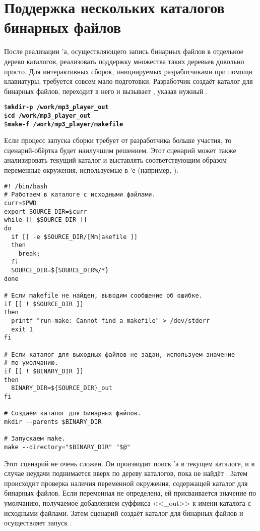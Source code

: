 \section{Поддержка нескольких каталогов бинарных файлов}

После реализации \Makefile{}'а, осуществляющего запись бинарных файлов
в отдельное дерево каталогов, реализовать поддержку множества таких
деревьев довольно просто. Для интерактивных сборок, инициируемых
разработчиками при помощи клавиатуры, требуется совсем мало
подготовки. Разработчик создаёт каталог для бинарных файлов, переходит
в него и вызывает \GNUmake{}, указав нужный \Makefile{}.

{\footnotesize
\begin{alltt}
\$ \textbf{mkdir -p ~/work/mp3\_player\_out}
\$ \textbf{cd ~/work/mp3\_player\_out}
\$ \textbf{make -f ~/work/mp3\_player/makefile}
\end{alltt}
}

Если процесс запуска сборки требует от разработчика больше участия, то
сценарий\hyp{}обёртка будет наилучшим решением. Этот сценарий может
также анализировать текущий каталог и выставлять соответствующим
образом переменные окружения, используемые в \Makefile{}'е (например,
).

{\footnotesize
\begin{verbatim}
#! /bin/bash
# Работаем в каталоге с исходными файлами.
curr=$PWD
export SOURCE_DIR=$curr
while [[ $SOURCE_DIR ]]
do
  if [[ -e $SOURCE_DIR/[Mm]akefile ]]
  then
    break;
  fi
  SOURCE_DIR=${SOURCE_DIR%/*}
done

# Если makefile не найден, выводим сообщение об ошибке.
if [[ ! $SOURCE_DIR ]]
then
  printf "run-make: Cannot find a makefile" > /dev/stderr
  exit 1
fi

# Если каталог для выходных файлов не задан, используем значение
# по умолчанию.
if [[ ! $BINARY_DIR ]]
then
  BINARY_DIR=${SOURCE_DIR}_out
fi

# Создаём каталог для бинарных файлов.
mkdir --parents $BINARY_DIR

# Запускаем make.
make --directory="$BINARY_DIR" "$@"
\end{verbatim}
}

Этот сценарий не очень сложен. Он производит поиск \Makefile{}'а в
текущем каталоге, и в случае неудачи поднимается вверх по дереву
каталогов, пока не найдёт \Makefile{}. Затем происходит проверка
наличия переменной окружения, содержащей каталог для бинарных файлов.
Если переменная не определена, ей присваивается значение по умолчанию,
получаемое добавлением суффикса <<\_out>> к имени каталога с исходными
файлами. Затем сценарий создаёт каталог для бинарных файлов и
осуществляет запуск \GNUmake{}.

